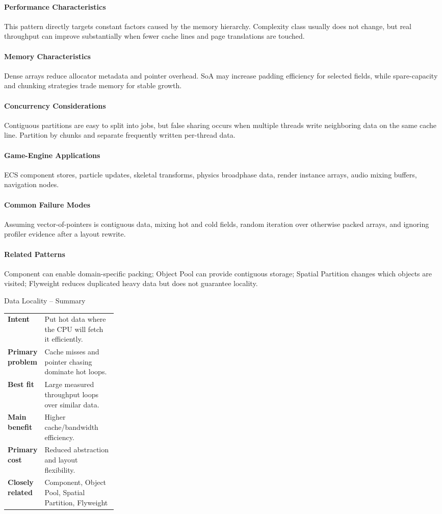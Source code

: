 \documentclass[11pt]{article}
\begin{document}
\paragraph{Performance Characteristics} This pattern directly targets constant factors caused by the memory hierarchy. Complexity class usually does not change, but real throughput can improve substantially when fewer cache lines and page translations are touched.
\paragraph{Memory Characteristics} Dense arrays reduce allocator metadata and pointer overhead. SoA may increase padding efficiency for selected fields, while spare-capacity and chunking strategies trade memory for stable growth.
\paragraph{Concurrency Considerations} Contiguous partitions are easy to split into jobs, but false sharing occurs when multiple threads write neighboring data on the same cache line. Partition by chunks and separate frequently written per-thread data.
\paragraph{Game-Engine Applications} ECS component stores, particle updates, skeletal transforms, physics broadphase data, render instance arrays, audio mixing buffers, navigation nodes.
\paragraph{Common Failure Modes} Assuming vector-of-pointers is contiguous data, mixing hot and cold fields, random iteration over otherwise packed arrays, and ignoring profiler evidence after a layout rewrite.
\paragraph{Related Patterns} Component can enable domain-specific packing; Object Pool can provide contiguous storage; Spatial Partition changes which objects are visited; Flyweight reduces duplicated heavy data but does not guarantee locality.

\begin{patternsummary}{Data Locality -- Summary}
\begin{tabularx}{\linewidth}{@{}>{\bfseries}p{0.25\linewidth}X@{}}
Intent & Put hot data where the CPU will fetch it efficiently. \\
Primary problem & Cache misses and pointer chasing dominate hot loops. \\
Best fit & Large measured throughput loops over similar data. \\
Main benefit & Higher cache/bandwidth efficiency. \\
Primary cost & Reduced abstraction and layout flexibility. \\
Closely related & Component, Object Pool, Spatial Partition, Flyweight \\
\end{tabularx}
\end{patternsummary}
\end{document}
